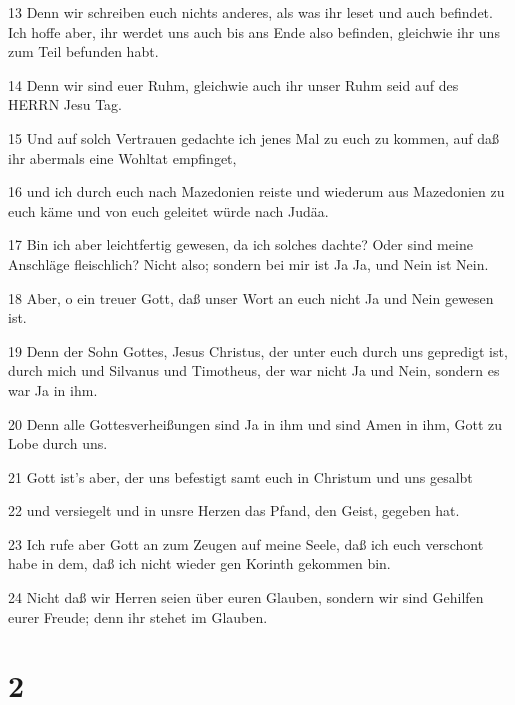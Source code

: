 \par 13 Denn wir schreiben euch nichts anderes, als was ihr leset und auch befindet. Ich hoffe aber, ihr werdet uns auch bis ans Ende also befinden, gleichwie ihr uns zum Teil befunden habt.
\par 14 Denn wir sind euer Ruhm, gleichwie auch ihr unser Ruhm seid auf des HERRN Jesu Tag.
\par 15 Und auf solch Vertrauen gedachte ich jenes Mal zu euch zu kommen, auf daß ihr abermals eine Wohltat empfinget,
\par 16 und ich durch euch nach Mazedonien reiste und wiederum aus Mazedonien zu euch käme und von euch geleitet würde nach Judäa.
\par 17 Bin ich aber leichtfertig gewesen, da ich solches dachte? Oder sind meine Anschläge fleischlich? Nicht also; sondern bei mir ist Ja Ja, und Nein ist Nein.
\par 18 Aber, o ein treuer Gott, daß unser Wort an euch nicht Ja und Nein gewesen ist.
\par 19 Denn der Sohn Gottes, Jesus Christus, der unter euch durch uns gepredigt ist, durch mich und Silvanus und Timotheus, der war nicht Ja und Nein, sondern es war Ja in ihm.
\par 20 Denn alle Gottesverheißungen sind Ja in ihm und sind Amen in ihm, Gott zu Lobe durch uns.
\par 21 Gott ist's aber, der uns befestigt samt euch in Christum und uns gesalbt
\par 22 und versiegelt und in unsre Herzen das Pfand, den Geist, gegeben hat.
\par 23 Ich rufe aber Gott an zum Zeugen auf meine Seele, daß ich euch verschont habe in dem, daß ich nicht wieder gen Korinth gekommen bin.
\par 24 Nicht daß wir Herren seien über euren Glauben, sondern wir sind Gehilfen eurer Freude; denn ihr stehet im Glauben.

\chapter{2}

